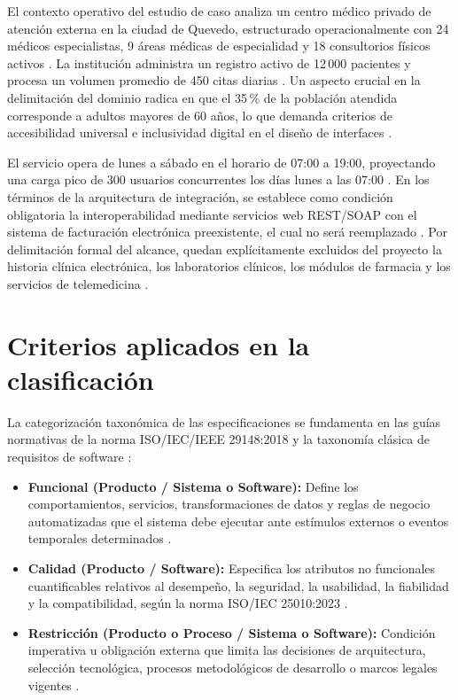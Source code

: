 \documentclass[11pt,a4paper]{article}
\begin{document}
	El contexto operativo del estudio de caso analiza un centro médico privado de atención externa en la ciudad de Quevedo, estructurado operacionalmente con 24 médicos especialistas, 9 áreas médicas de especialidad y 18 consultorios físicos activos \cite{bass2021}. La institución administra un registro activo de 12\,000 pacientes y procesa un volumen promedio de 450 citas diarias \cite{bourque2014}. Un aspecto crucial en la delimitación del dominio radica en que el 35\,\% de la población atendida corresponde a adultos mayores de 60 años, lo que demanda criterios de accesibilidad universal e inclusividad digital en el diseño de interfaces \cite{iso25010, nielsen1994}.
	
	El servicio opera de lunes a sábado en el horario de 07:00 a 19:00, proyectando una carga pico de 300 usuarios concurrentes los días lunes a las 07:00 \cite{brooks1987}. En los términos de la arquitectura de integración, se establece como condición obligatoria la interoperabilidad mediante servicios web REST/SOAP con el sistema de facturación electrónica preexistente, el cual no será reemplazado \cite{garlan1993, fielding2000}. Por delimitación formal del alcance, quedan explícitamente excluidos del proyecto la historia clínica electrónica, los laboratorios clínicos, los módulos de farmacia y los servicios de telemedicina \cite{sommerville2019, jacobson1992}.
	
	\section{Criterios aplicados en la clasificación}
	La categorización taxonómica de las especificaciones se fundamenta en las guías normativas de la norma ISO/IEC/IEEE 29148:2018 y la taxonomía clásica de requisitos de software \cite{iso29148, pohl2025, wiegers2013}:
	\begin{itemize}[leftmargin=*, itemsep=4pt]
		\item \textbf{Funcional (Producto / Sistema o Software):} Define los comportamientos, servicios, transformaciones de datos y reglas de negocio automatizadas que el sistema debe ejecutar ante estímulos externos o eventos temporales determinados \cite{sommerville2019, jacobson1992, meyer1997}.
		\item \textbf{Calidad (Producto / Software):} Especifica los atributos no funcionales cuantificables relativos al desempeño, la seguridad, la usabilidad, la fiabilidad y la compatibilidad, según la norma ISO/IEC 25010:2023 \cite{iso25010, bass2021, chung2000}.
		\item \textbf{Restricción (Producto o Proceso / Sistema o Software):} Condición imperativa u obligación externa que limita las decisiones de arquitectura, selección tecnológica, procesos metodológicos de desarrollo o marcos legales vigentes \cite{iso29148, pressman2020, ecuador2021}.
	\end{itemize}
	
\end{document}
